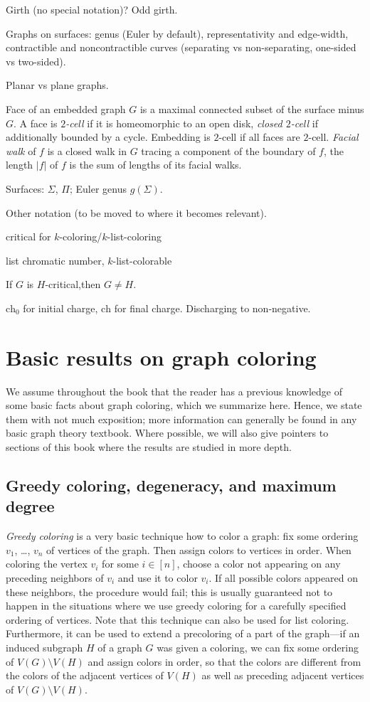 \documentclass[12pt,twoside,openright,a4paper]{book}
\newcommand{\initch}{\text{ch}_0}
\newcommand{\finch}{\text{ch}}
\begin{document}
Girth (no special notation)? Odd girth.

Graphs on surfaces: genus (Euler by default), representativity and edge-width, contractible and
noncontractible curves (separating vs non-separating, one-sided vs two-sided).

Planar vs plane graphs.

Face of an embedded graph $G$ is a maximal connected subset of the surface minus $G$.
A face is \emph{$2$-cell} if it is homeomorphic to an open disk, \emph{closed $2$-cell}
if additionally bounded by a cycle.  Embedding is $2$-cell if all faces are $2$-cell.
\emph{Facial walk} of $f$ is a closed walk in $G$ tracing
a component of the boundary of $f$, the length $|f|$ of $f$ is the sum of lengths of its facial
walks.

Surfaces: $\Sigma$, $\Pi$; Euler genus $g(\Sigma)$.

Other notation (to be moved to where it becomes relevant).

critical for $k$-coloring/$k$-list-coloring

list chromatic number, $k$-list-colorable

If $G$ is $H$-critical,then $G\neq H$.

$\initch$ for initial charge, $\finch$ for final charge.  Discharging to non-negative.

\section{Basic results on graph coloring}

We assume throughout the book that the reader has a previous knowledge of some basic facts
about graph coloring, which we summarize here.  Hence, we state them with not much exposition;
more information can generally be found in any basic graph theory textbook.
Where possible, we will also give pointers to sections of this book where the results are
studied in more depth.

\subsection{Greedy coloring, degeneracy, and maximum degree}

\emph{Greedy coloring} is a very basic technique how to color a graph: fix some ordering $v_1$, \ldots, $v_n$ of
vertices of the graph.  Then assign colors to vertices in order. When coloring the vertex $v_i$ for some $i\in[n]$,
choose a color not appearing on any preceding neighbors of $v_i$ and use it to color $v_i$.  If all possible colors
appeared on these neighbors, the procedure would fail; this is usually guaranteed not to happen in the situations where
we use greedy coloring for a carefully specified ordering of vertices.  Note that this technique can also be used for list coloring.
Furthermore, it can be used to extend a precoloring of a part of the graph---if an induced subgraph $H$ of a graph $G$ was given
a coloring, we can fix some ordering of $V(G)\setminus V(H)$ and assign colors in order, so that the colors are different
from the colors of the adjacent vertices of $V(H)$ as well as preceding adjacent vertices of $V(G)\setminus V(H)$.
\end{document}
